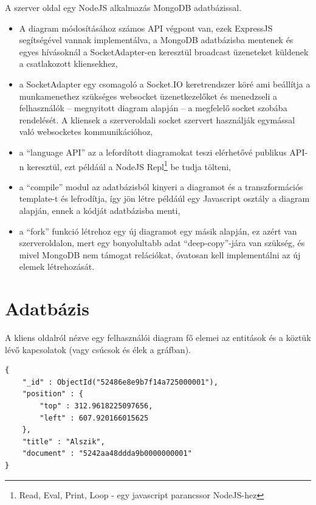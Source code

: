 A szerver oldal egy NodeJS alkalmazás MongoDB adatbázissal.   

\begin{itemize}
\item A diagram módosításához számos API végpont van, ezek ExpressJS segítségével vannak implementálva, a MongoDB adatbázisba mentenek és egyes hívásoknál a SocketAdapter-en keresztül broadcast üzeneteket küldenek a csatlakozott kliensekhez,
\item a SocketAdapter egy csomagoló a Socket.IO keretrendszer köré ami beállítja a munkamenethez szükséges websocket üzenetkezelőket és menedzseli a felhasználók -- megnyitott diagram alapján -- a megfelelő socket szobába rendelését. A kliensek a szerveroldali socket szervert használják egymással való websocketes kommunikációhoz, 
\item a ``language API'' az a lefordított diagramokat teszi elérhetővé publikus API-n keresztül, ezt példáúl a NodeJS Repl\footnote{Read, Eval, Print, Loop - egy javascript parancssor NodeJS-hez} be tudja tölteni,
\item a ``compile'' modul az adatbázisból kinyeri a diagramot és a transzformációs template-t és lefrodítja, így jön létre példáúl egy Javascript osztály a diagram alapján, ennek a kódját adatbázisba menti, 
\item a ``fork'' funkció létrehoz egy új diagramot egy másik alapján, ez azért van szerveroldalon, mert egy bonyolultabb adat ``deep-copy''-jára van szükség, és mivel MongoDB nem támogat relációkat, óvatosan kell implementálni az új elemek létrehozását.
\end{itemize}

\section{Adatbázis}

A kliens oldalról nézve egy felhasználói diagram fő elemei az entitások és a köztük lévő kapcsolatok (vagy csúcsok és élek a gráfban). 


\begin{lstlisting}[label=entity,caption=Egy gráf csúcs -- vagy entitás -- reprezentálása az adatbázisban]
{
    "_id" : ObjectId("52486e8e9b7f14a725000001"),
    "position" : {
        "top" : 312.9618225097656,
        "left" : 607.920166015625
    },
    "title" : "Alszik",
    "document" : "5242aa48ddda9b0000000001"
}
\end{lstlisting}

